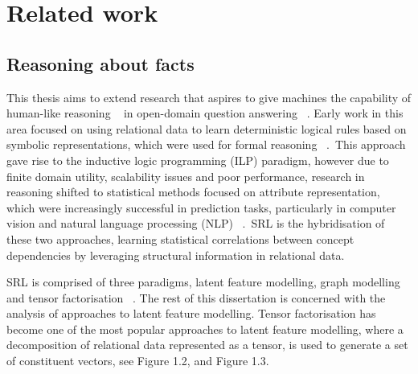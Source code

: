 \section{Related work} %

\subsection{Reasoning about facts} 

\noindent This thesis aims to extend research that aspires to give machines the capability of human-like reasoning \unskip~\citep{bordes2011learning} in open-domain question answering \unskip~\citep{hakimov2019evaluating}. Early work in this area focused on using relational data to learn deterministic logical rules based on symbolic representations, which were used for formal reasoning \unskip~\citep{hohenecker2017deep}.\ This approach gave rise to the inductive logic programming (ILP) paradigm, however due to finite domain utility, scalability issues and poor performance, research in reasoning shifted to statistical methods focused on attribute representation, which were increasingly successful in prediction tasks, particularly in computer vision and natural language processing (NLP) \unskip~\citep{koller2007introduction}.\ SRL is the hybridisation of these two approaches, learning statistical correlations between concept dependencies by leveraging structural information in relational data. \par

\noindent SRL is comprised of three paradigms, latent feature modelling, graph modelling and tensor factorisation \unskip~\citep{nickel2015review}. The rest of this dissertation is concerned with the analysis of approaches to latent feature modelling. Tensor factorisation has become one of the most popular approaches to latent feature modelling, where a decomposition of relational data represented as a tensor, is used to generate a set of constituent vectors, see Figure 1.2, and Figure 1.3. \par

